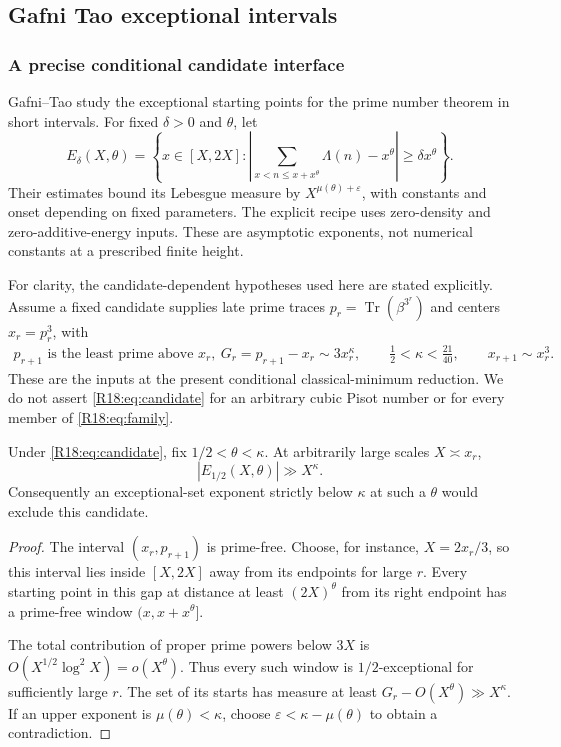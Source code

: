 \documentclass[11pt,a4paper]{article}
\theoremstyle{definition}\newtheorem{definition}[theorem]{Definition}
\theoremstyle{remark}\newtheorem{remark}[theorem]{Remark}
\DeclareMathOperator{\Tr}{Tr}\DeclareMathOperator{\tr}{tr}\DeclareMathOperator{\Nm}{N}
\begin{document}
\subsection{Gafni Tao exceptional intervals}\label{R18:sec:interval}

\subsubsection{A precise conditional candidate interface}

Gafni--Tao \cite[Definition 1.1 and Theorem 1.3]{R18-GT2026} study
the exceptional starting points for the prime number theorem in short
intervals. For fixed $\delta>0$ and $\theta$, let
\[
 E_\delta(X,\theta)=
 \left\{x\in[X,2X]:
 \left|\sum_{x<n\le x+x^\theta}\Lambda(n)-x^\theta\right|
 \ge\delta x^\theta\right\}.
\]
Their estimates bound its Lebesgue measure by
$X^{\mu(\theta)+\varepsilon}$, with constants and onset depending
on fixed parameters. The explicit recipe uses zero-density and
zero-additive-energy inputs. These are asymptotic exponents, not
numerical constants at a prescribed finite height.

For clarity, the candidate-dependent hypotheses used here are stated
explicitly. Assume a fixed candidate supplies late prime traces
$p_r=\Tr(\beta^{3^r})$ and centers $x_r=p_r^3$, with
\begin{equation}\label{R18:eq:candidate}
\begin{gathered}
 p_{r+1}\text{ is the least prime above }x_r,\
 G_r=p_{r+1}-x_r\sim3x_r^\kappa,\qquad
 \tfrac12<\kappa<\tfrac{21}{40},\qquad
 x_{r+1}\sim x_r^3.
\end{gathered}
\end{equation}
These are the inputs at the present conditional classical-minimum
reduction. We do not assert \eqref{R18:eq:candidate} for an arbitrary
cubic Pisot number or for every member of \eqref{R18:eq:family}.

\begin{proposition}\label{R18:prop:exceptional-block}
Under \eqref{R18:eq:candidate}, fix $1/2<\theta<\kappa$.
At arbitrarily large scales $X\asymp x_r$,
\[
 |E_{1/2}(X,\theta)|\gg X^\kappa.
\]
Consequently an exceptional-set exponent strictly below $\kappa$
at such a $\theta$ would exclude this candidate.
\end{proposition}
\begin{proof}
The interval $(x_r,p_{r+1})$ is prime-free. Choose, for instance,
$X=2x_r/3$, so this interval lies inside $[X,2X]$ away from its
endpoints for large $r$. Every starting point in this gap at distance
at least $(2X)^\theta$ from its right endpoint has a prime-free
window $(x,x+x^\theta]$.

The total contribution of proper prime powers below $3X$ is
$O(X^{1/2}\log^2X)=o(X^\theta)$. Thus every such window is
$1/2$-exceptional for sufficiently large $r$. The set of its starts
has measure at least $G_r-O(X^\theta)\gg X^\kappa$.
If an upper exponent is $\mu(\theta)<\kappa$, choose
$\varepsilon<\kappa-\mu(\theta)$ to obtain a contradiction.
\end{proof}
\end{document}
